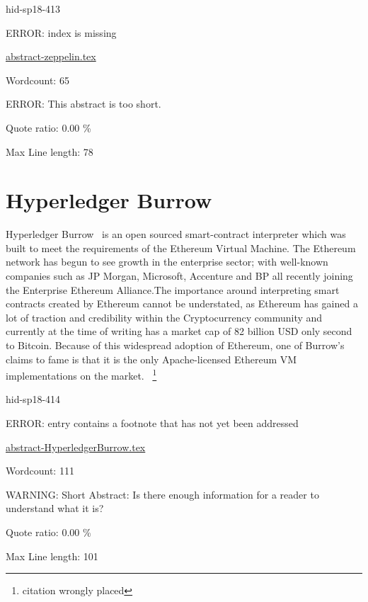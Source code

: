 \begin{IU}

hid-sp18-413

ERROR: index is missing

\href{https://github.com/cloudmesh-community/hid-sp18-413/blob/master//technology/abstract-zeppelin.tex}{abstract-zeppelin.tex}

 

Wordcount: 65

ERROR: This abstract is too short.


Quote ratio: 0.00 \%
 
Max Line length: 78
\end{IU}

\section{Hyperledger Burrow}

Hyperledger Burrow~\cite{hid-sp18-414-Behlendorf} is an open sourced smart-contract interpreter which
was built to meet the requirements of the Ethereum Virtual
Machine. The Ethereum network has begun to see growth in the
enterprise sector; with well-known companies such as JP Morgan,
Microsoft, Accenture and BP all recently joining the Enterprise
Ethereum Alliance.The importance around interpreting
smart contracts created by Ethereum cannot be understated, as Ethereum
has gained a lot of traction and credibility within the Cryptocurrency
community and currently at the time of writing has a market cap of 82
billion USD only second to Bitcoin. Because of this widespread
adoption of Ethereum, one of Burrow's claims to fame is that it is the
only Apache-licensed Ethereum VM implementations on the
market.~\cite{hid-sp18-414-Hyperledger_Burrow}
\footnote{citation wrongly placed}



\begin{IU}

hid-sp18-414

ERROR: entry contains a footnote that has not yet been addressed

\href{https://github.com/cloudmesh-community/hid-sp18-414/blob/master//technology/abstract-HyperledgerBurrow.tex}{abstract-HyperledgerBurrow.tex}

 

Wordcount: 111

WARNING: Short Abstract: Is there enough information for a reader to understand what it is?


Quote ratio: 0.00 \%
 
Max Line length: 101
\end{IU}

